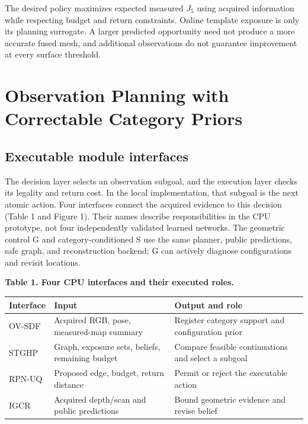 \documentclass[11pt,a4paper]{article}
\newlength{\ReviewTableWidth}
\begin{document}
The desired policy maximizes expected measured \(J_5\) using acquired information while respecting budget and return constraints. Online template exposure is only its planning surrogate. A larger predicted opportunity need not produce a more accurate fused mesh, and additional observations do not guarantee improvement at every surface threshold.

\hypertarget{observation-planning-with-correctable-category-priors}{%
\section{Observation Planning with Correctable Category Priors}\label{observation-planning-with-correctable-category-priors}}

\hypertarget{executable-module-interfaces}{%
\subsection{Executable module interfaces}\label{executable-module-interfaces}}

The decision layer selects an observation subgoal, and the execution layer checks its legality and return cost. In the local implementation, that subgoal is the next atomic action. Four interfaces connect the acquired evidence to this decision (Table 1 and Figure 1). Their names describe responsibilities in the CPU prototype, not four independently validated learned networks. The geometric control G and category-conditioned S use the same planner, public predictions, safe graph, and reconstruction backend; G can actively diagnose configurations and revisit locations.

\par\noindent\begin{minipage}{\linewidth}
\textbf{Table 1. Four CPU interfaces and their executed roles.}

\begin{center}
\small
\setlength{\tabcolsep}{4pt}
\setlength{\ReviewTableWidth}{\dimexpr\linewidth-4\tabcolsep\relax}
\begin{tabular}{@{}>{\raggedright\arraybackslash}p{0.28\ReviewTableWidth} >{\raggedright\arraybackslash}p{0.36\ReviewTableWidth} >{\raggedright\arraybackslash}p{0.36\ReviewTableWidth}@{}}
\toprule
Interface & Input & Output and role \\
\midrule
OV-SDF & Acquired RGB, pose, measured-map summary & Register category support and configuration prior \\
STGHP & Graph, exposure sets, beliefs, remaining budget & Compare feasible continuations and select a subgoal \\
RPN-UQ & Proposed edge, budget, return distance & Permit or reject the executable action \\
IGCR & Acquired depth/scan and public predictions & Bound geometric evidence and revise belief \\
\bottomrule
\end{tabular}
\end{center}
\end{minipage}
\end{document}
